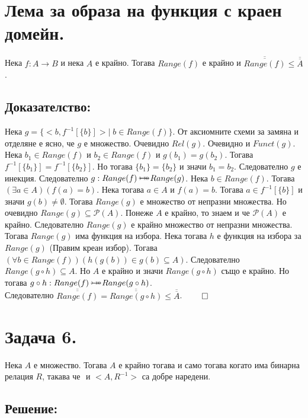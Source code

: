 \documentclass[12pt]{article}
\newcommand{\bijection}[0]{\mathbin{\mathlarger{\mathlarger{\rightarrowtail}} \hspace{-14pt} \mathlarger{\mathlarger{\twoheadrightarrow}}}}
\begin{document}
\section*{Лема за образа на функция с краен домейн.}
Нека \(f : A \to B\) и нека \(A\) е крайно.
Тогава \(Range(f)\) е крайно и \(\overline{\overline{Range(f)}} \leq \overline{\overline{A}}\).

\subsection*{Доказателство:}
Нека \(g = \{<b, f^{-1}[\{b\}]> | \; b \in Range(f)\}\).
От аксиомните схеми за замяна и отделяне е ясно, че \(g\) е множество.
Очевидно \(Rel(g)\).
Очевидно и \(Funct(g)\).
Нека \(b_1 \in Range(f)\) и \(b_2 \in Range(f)\)
и \(g(b_1) = g(b_2)\).
Тогава \(f^{-1}[\{b_1\}] = f^{-1}[\{b_2\}]\).
Но тогава \(\{b_1\} = \{b_2\}\) и значи \(b_1 = b_2\).
Следователно \(g\) е инекция.
Следователно \(g : Range(f) \bijection Range(g)\).
Нека \(b \in Range(f)\). Тогава \((\exists a \in A)(f(a) = b)\).
Нека тогава \(a \in A\) и \(f(a) = b\).
Тогава \(a \in f^{-1}[\{b\}]\) и значи \(g(b) \neq \emptyset\).
Тогава \(Range(g)\) е множество от непразни множества.
Но очевидно \(Range(g) \subseteq \mathcal{P}(A)\).
Понеже \(A\) е крайно, то знаем и че \(\mathcal{P}(A)\) е крайно.
Следователно \(Range(g)\) е крайно множество от непразни множества.
Тогава \(Range(g)\) има функция на избора.
Нека тогава \(h\) е функция на избора за \(Range(g)\) (Правим креан избор).
Тогава \((\forall b \in Range(f))(h(g(b)) \in g(b) \subseteq A)\).
Следователно \(Range(g \circ h) \subseteq A\).
Но \(A\) е крайно и значи \(Range(g \circ h)\) също е крайно.
Но тогава \(g \circ h : Range(f) \bijection Range(g \circ h)\). \\
Следователно \(\overline{\overline{Range(f)}} = \overline{\overline{Range(g \circ h)}} \leq \overline{\overline{A}}\). \(\qed\)

\section*{Задача 6.}
Нека \(A\) е множество. Тогава \(A\) е крайно тогава и само тогава когато
има бинарна релация \(R\), такава че \(<A, R>\) и \(<A, R^{-1}>\) са добре наредени.

\subsection*{Решение:}
\end{document}

